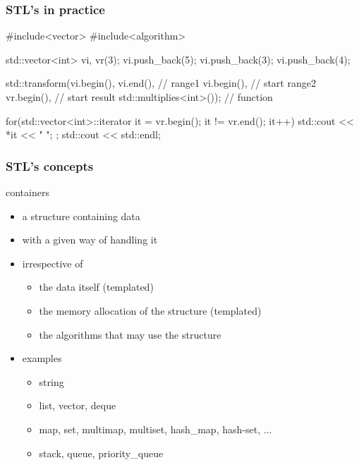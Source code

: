 \begin{frame}[fragile,label=STLcode]
  \frametitle{STL's in practice}
  \begin{cppcode*}{}
    #include<vector>
    #include<algorithm>

    std::vector<int> vi, vr(3);
    vi.push_back(5); vi.push_back(3); vi.push_back(4);

    std::transform(vi.begin(), vi.end(),      // range1
                   vi.begin(),          // start range2
                   vr.begin(),          // start result
                   std::multiplies<int>()); // function

    for(std::vector<int>::iterator it = vr.begin();
        it != vr.end();
        it++) {
      std::cout << *it << " ";
    };
    std::cout << std::endl;
  \end{cppcode*}
\end{frame}

\begin{frame}[fragile]
  \frametitle{STL's concepts}
  \begin{block}{containers}
    \begin{itemize}
    \item a structure containing data
    \item with a given way of handling it
    \item irrespective of
      \begin{itemize}
      \item the data itself (templated)
      \item the memory allocation of the structure (templated)
      \item the algorithms that may use the structure
      \end{itemize}
    \item examples
      \begin{itemize}
      \item string
      \item list, vector, deque
      \item map, set, multimap, multiset, hash\_map, hash-set, ...
      \item stack, queue, priority\_queue
      \end{itemize}
    \end{itemize}
  \end{block}
\end{frame}


